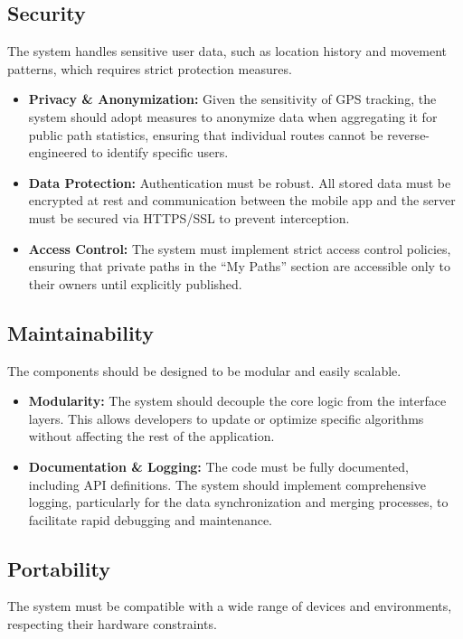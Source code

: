 \subsection{Security}
\label{subsec:security}
The system handles sensitive user data, such as location history and movement patterns, which requires strict protection measures.

\begin{itemize}
    \item \textbf{Privacy \& Anonymization:} Given the sensitivity of GPS tracking, the system should adopt measures to anonymize data when aggregating it for public path statistics, ensuring that individual routes cannot be reverse-engineered to identify specific users.
    
    \item \textbf{Data Protection:} Authentication must be robust. All stored data must be encrypted at rest and communication between the mobile app and the server must be secured via HTTPS/SSL to prevent interception.
    
    \item \textbf{Access Control:} The system must implement strict access control policies, ensuring that private paths in the ``My Paths'' section are accessible only to their owners until explicitly published.
\end{itemize}

\subsection{Maintainability}
\label{subsec:maintainability}
The components should be designed to be modular and easily scalable.

\begin{itemize}
    \item \textbf{Modularity:} The system should decouple the core logic from the interface layers. This allows developers to update or optimize specific algorithms without affecting the rest of the application.
    
    \item \textbf{Documentation \& Logging:} The code must be fully documented, including API definitions. The system should implement comprehensive logging, particularly for the data synchronization and merging processes, to facilitate rapid debugging and maintenance.
\end{itemize}

\subsection{Portability}
\label{subsec:portability}
The system must be compatible with a wide range of devices and environments, respecting their hardware constraints.

